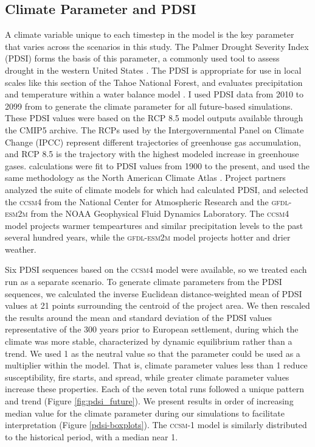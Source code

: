 \subsection{Climate Parameter and PDSI}
A climate variable unique to each timestep in the model is the key parameter that varies across the scenarios in this study. The Palmer Drought Severity Index (PDSI) forms the basis of this parameter, a commonly used tool to assess drought in the western United States \citep{Cook2004}. The PDSI is appropriate for use in local scales like this section of the Tahoe National Forest, and evaluates precipitation and temperature within a water balance model \citep{HeimJr2002}. I used PDSI data from 2010 to 2099 from \citet{Cook2014} to generate the climate parameter for all future-based simulations. These PDSI values were based on the RCP 8.5 model outputs available through the CMIP5 archive. The RCPs used by the Intergovernmental Panel on Climate Change (IPCC) represent different trajectories of greenhouse gas accumulation, and RCP 8.5 is the trajectory with the highest modeled increase in greenhouse gases. \citet{Cook2014} calculations were fit to PDSI values from 1900 to the present, and used the same methodology as the North American Climate Atlas \citep{Cook2004}. Project partners analyzed the suite of climate models for which \citet{Cook2014} had calculated PDSI, and selected the \textsc{ccsm4} from the National Center for Atmospheric Research and the \textsc{gfdl-esm2m} from the NOAA Geophysical Fluid Dynamics Laboratory. The \textsc{ccsm4} model projects warmer tempeartures and similar precipitation levels to the past several hundred years, while the \textsc{gfdl-esm2m} model projects hotter and drier weather.

Six PDSI sequences based on the \textsc{ccsm4} model were available, so we treated each run as a separate scenario. To generate climate parameters from the PDSI sequences, we calculated the inverse Euclidean distance-weighted mean of PDSI values at 21 points surrounding the centroid of the project area. We then rescaled the results around the mean and standard deviation of the PDSI values representative of the 300 years prior to European settlement, during which the climate was more stable, characterized by dynamic equilibrium rather than a trend. We used 1 as the neutral value so that the parameter could be used as a multiplier within the model. That is, climate parameter values less than 1 reduce susceptibility, fire starts, and spread, while greater climate parameter values increase these properties. Each of the seven total runs followed a unique pattern and trend (Figure \ref{fig:pdsi_future}). We present results in order of increasing median value for the climate parameter during our simulations to facilitate interpretation (Figure \ref{pdsi-boxplots}). The \textsc{ccsm-1} model is similarly distributed to the historical period, with a median near 1.


